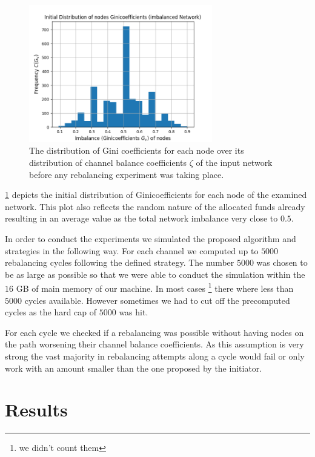 \documentclass[a4paper]{paper}
\begin{document}
\begin{figure}
 \centering
 \includegraphics[width=8cm]{code/vs/fig/initial_ginis_before_rebalancing.png}
 \caption{The distribution of Gini coefficients for each node over its distribution of channel balance coefficients $\zeta$ of the input network before any rebalancing experiment was taking place.}
 \label{fig:initial_ginis}
\end{figure}
\cref{fig:initial_ginis} depicts the initial distribution of Ginicoefficients for each node of the examined network.
This plot also reflects the random nature of the allocated funds already resulting in an average value as the total network imbalance very close to $0.5$.

In order to conduct the experiments we simulated the proposed algorithm and strategies in the following way.
For each channel we computed up to $5000$ rebalancing cycles following the defined strategy.
The number $5000$ was chosen to be as large as possible so that we were able to conduct the simulation within the $16$ GB of main memory of our machine.
In most cases \footnote{we didn't count them} there where less than $5000$ cycles available.
However sometimes we had to cut off the precomputed cycles as the hard cap of $5000$ was hit.

For each cycle we checked if a rebalancing was possible without having nodes on the path worsening their channel balance coefficients.
As this assumption is very strong the vast majority in rebalancing attempts along a cycle would fail or only work with an amount smaller than the one proposed by the initiator. 
 
\section{Results}
\label{sec:results}
\end{document}
